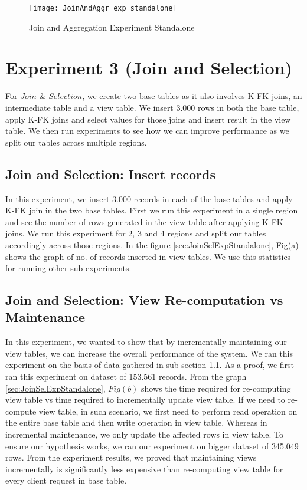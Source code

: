 \documentclass[11pt,a4paper,bibtotoc,idxtotoc,headsepline,footsepline,footexclude,BCOR12mm,DIV13]{scrbook}
\begin{document}
\begin{figure}
	\centering
	\texttt{[image: JoinAndAggr\_exp\_standalone]}
	\caption{Join and Aggregation Experiment Standalone}
	\label{sec:JoinAggrExpStandalone}
	
\end{figure} 
\newpage

\section{Experiment 3 (Join and Selection)}
\label{(sec:Join and Selection Exp Standalone)} 
For $Join$ \& $Selection$, we create two base tables as it also involves K-FK joins, an intermediate table and a view table. We insert 3.000 rows in both the base table, apply K-FK joins and select values for those joins and insert result in the view table. We then run experiments to see how we can improve performance as we split our tables across multiple regions.

\subsection{Join and Selection: Insert records}
\label{Join and Selection: Insert records Standalone}
In this experiment, we insert 3.000 records in each of the base tables and apply K-FK join in the two base tables. First we run this experiment in a single region and see the number of rows generated in the view table after applying K-FK joins. We run this experiment for 2, 3 and 4 regions and split our tables accordingly across those regions. In the figure \ref{sec:JoinSelExpStandalone}, Fig(a) shows the graph of no. of records inserted in view tables. We use this statistics for running other sub-experiments.

\subsection{Join and Selection: View Re-computation vs Maintenance}
\label{Join and Selection: View Re-computation vs Maintenance Standalone}
In this experiment, we wanted to show that by incrementally maintaining our view tables, we can increase the overall performance of the system. We ran this experiment on the basis of data gathered in sub-section \ref{Join and Selection: Insert records Standalone}. As a proof, we first ran this experiment on dataset of 153.561 records. From the graph \ref{sec:JoinSelExpStandalone}, $Fig(b)$ shows the time required for re-computing view table vs time required to incrementally update view table. If we need to re-compute view table, in such scenario, we first need to perform read operation on the entire base table and then write operation in view table. Whereas in incremental maintenance, we only update the affected rows in view table. To ensure our hypothesis works, we ran our experiment on bigger dataset of 345.049 rows. From the experiment results, we proved that maintaining views incrementally is significantly less expensive than re-computing view table for every client request in base table.
\end{document}
